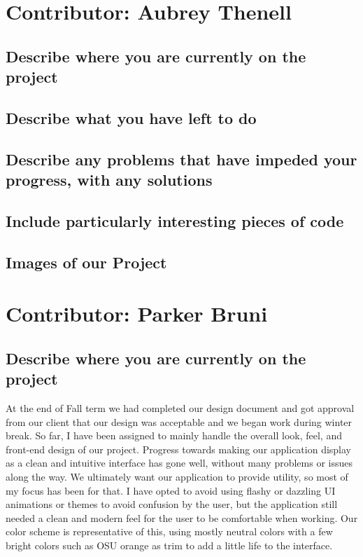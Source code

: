 \documentclass[letterpaper,10pt,serif,draftclsnofoot,onecolumn,compsoc,titlepage]{IEEEtran}
\begin{document}
\section{Contributor: Aubrey Thenell}
\subsection{Describe where you are currently on the project}
\subsection{Describe what you have left to do}
\subsection{Describe any problems that have impeded your progress, with any solutions}
\subsection{Include particularly interesting pieces of code}
\subsection{Images of our Project} 




\section{Contributor: Parker Bruni}
\subsection{Describe where you are currently on the project}
	At the end of Fall term we had completed our design document and got approval from our client that our design was acceptable and we began work during winter break.
	So far, I have been assigned to mainly handle the overall look, feel, and front-end design of our project. Progress towards making our application display as a clean and intuitive 
	interface has gone well, without many problems or issues along the way. We ultimately want our application to provide utility, so most of my focus has been for that. I have
	opted to avoid using flashy or dazzling UI animations or themes to avoid confusion by the user, but the application still needed a clean and modern feel for the user to be 
	comfortable when working. Our color scheme is representative of this, using mostly neutral colors with a few bright colors such as OSU orange as trim to add a little life 
	to the interface. 
	
\end{document}
